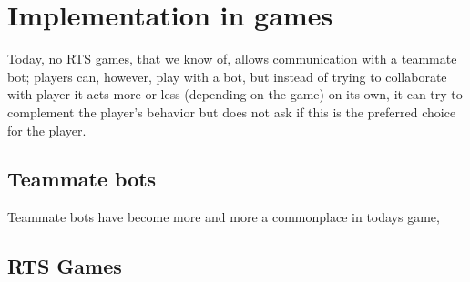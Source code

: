 \section{Implementation in games}

Today, no RTS games, that we know of, allows communication with a teammate bot; players can, however, play with a bot, but instead of trying to collaborate with player it acts more or less (depending on the game) on its own, it can try to complement the player's behavior but does not ask if this is the preferred choice for the player.


\subsection{Teammate bots}
\label{sec:teammate_bots}
Teammate bots have become more and more a commonplace in todays game, 

\subsection{RTS Games}